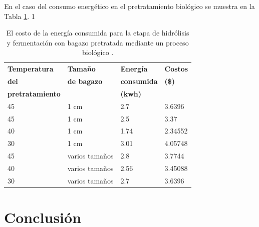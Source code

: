 \documentclass[12pt]{article}
\begin{document}
	En el caso del consumo energético en el pretratamiento biológico se muestra en la Tabla 	\ref{energi_fermentacion en biologico}.
	1
	\begin{table}[H]
		\centering
			\label{energi_fermentacion en biologico}
		\caption{El costo de la energía consumida para la etapa de hidrólisis y fermentación con bagazo pretratada mediante un proceso biológico . }
            {\fontsize{9}{10.8}\selectfont %
		\begin{tabular}{|l|l|l|l|}
				\hline
\textbf{Temperatura} & \textbf{Tamaño } & \textbf{Energía } & \textbf{Costos } \\ 
\textbf{del} &	\textbf{ de bagazo}   & 	\textbf{consumida  }& 	\textbf{(\$)} \\ 
\textbf{pretratamiento}  &    & \textbf{(kwh)} &  \\ \hline
			45 & 1 cm & 2.7 & 3.6396  \\ \hline
			45 & 1 cm & 2.5 & 3.37  \\ \hline
			40 & 1 cm & 1.74 & 2.34552  \\ \hline
			30 & 1 cm & 3.01 & 4.05748  \\ \hline
			45 & varios tamaños & 2.8 & 3.7744  \\ \hline
			40 & varios tamaños & 2.56 & 3.45088  \\ \hline
			30 & varios tamaños & 2.7 & 3.6396  \\ \hline
		\end{tabular}
}
	\end{table}
	
	
			
		\section{Conclusión}
			
			
		
		\newpage
	


	  	 
	   
	   
\end{document}
